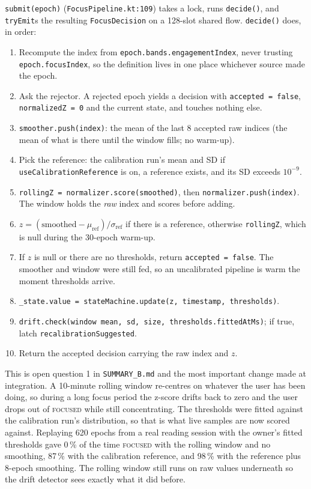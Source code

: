 \documentclass[10pt,a4paper]{article}
\newcommand{\file}[1]{\texttt{\small #1}}          %
\newcommand{\code}[1]{\texttt{#1}}                  %
\newcommand{\state}[1]{\textsc{\small #1}}          %
\begin{document}
\code{submit(epoch)} (\file{FocusPipeline.kt:109}) takes a lock, runs \code{decide()}, and
\code{tryEmit}s the resulting \code{FocusDecision} on a 128-slot shared flow. \code{decide()}
does, in order:

\begin{enumerate}
\item Recompute the index from \code{epoch.bands.engagementIndex}, never trusting
  \code{epoch.focusIndex}, so the definition lives in one place whichever source made the epoch.
\item Ask the rejector. A rejected epoch yields a decision with \code{accepted = false},
  \code{normalizedZ = 0} and the current state, and touches nothing else.
\item \code{smoother.push(index)}: the mean of the last 8 accepted raw indices (the mean of what is
  there until the window fills; no warm-up).
\item Pick the reference: the calibration run's mean and SD if \code{useCalibrationReference} is on,
  a reference exists, and its SD exceeds $10^{-9}$.
\item \code{rollingZ = normalizer.score(smoothed)}, then \code{normalizer.push(index)}. The window
  holds the \emph{raw} index and scores before adding.
\item $z = (\text{smoothed} - \mu_{\text{ref}})/\sigma_{\text{ref}}$ if there is a reference,
  otherwise \code{rollingZ}, which is null during the 30-epoch warm-up.
\item If $z$ is null or there are no thresholds, return \code{accepted = false}. The smoother and
  window were still fed, so an uncalibrated pipeline is warm the moment thresholds arrive.
\item \code{\_state.value = stateMachine.update(z, timestamp, thresholds)}.
\item \code{drift.check(window mean, sd, size, thresholds.fittedAtMs)}; if true, latch
  \code{recalibrationSuggested}.
\item Return the accepted decision carrying the raw index and $z$.
\end{enumerate}

\begin{why}
This is open question 1 in \file{SUMMARY\_B.md} and the most important change made at
integration. A 10-minute rolling window re-centres on whatever the user has been doing, so during
a long focus period the z-score drifts back to zero and the user drops out of \state{focused}
while still concentrating. The thresholds were fitted against the calibration run's distribution,
so that is what live samples are now scored against. Replaying 620 epochs from a real reading
session with the owner's fitted thresholds gave 0\,\% of the time \state{focused} with the rolling
window and no smoothing, 87\,\% with the calibration reference, and 98\,\% with the reference plus
8-epoch smoothing. The rolling window still runs on raw values underneath so the drift detector
sees exactly what it did before.
\end{why}
\end{document}
